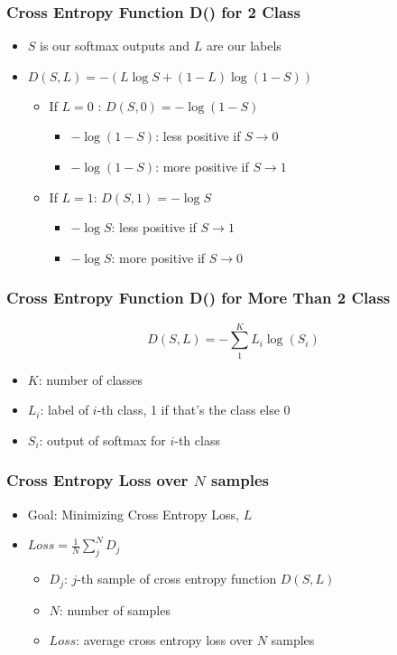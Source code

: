 \documentclass[14 pt]{beamer}
\let\olditem\item
\renewcommand{\item}{\olditem\vspace{4pt}}
\begin{document}
\begin{frame}
  \frametitle{Cross Entropy Function D() for 2 Class}
  \begin{itemize}
  \item $S$  is our softmax outputs and $L$ are our labels
  \item $D(S, L) = -(L\log S + (1 - L)\log (1 - S))$
    \begin{itemize}
    \item If $L = 0$ : $D(S, 0)  = -\log(1 - S)$
      \begin{itemize}
      \item $-\log (1 - S)$: less positive if $S \to 0$
      \item $-\log (1 - S)$: more positive if $S \to 1$
      \end{itemize}
    \item If $L = 1$: $D(S, 1) = -\log S$
      \begin{itemize}
      \item $-\log S$: less positive if $S\to 1$
      \item $-\log S$: more positive if $S\to 0$
      \end{itemize}
    \end{itemize}
  \end{itemize}
\end{frame}

\begin{frame}
  \frametitle{Cross Entropy Function D() for More Than 2 Class}
  \begin{displaymath}
    D(S, L) = -\sum_1^K L_i \log (S_i)
  \end{displaymath}
  \begin{itemize}
  \item $K$: number of classes
  \item $L_i$: label of $i$-th class, 1 if that's the class else 0
  \item $S_i$: output of softmax for $i$-th class
  \end{itemize}
\end{frame}

\begin{frame}
  \frametitle{Cross Entropy Loss over $N$ samples}
  \begin{itemize}
  \item Goal: Minimizing Cross Entropy Loss, $L$
  \item $Loss = \frac{1}{N}\sum_j^N D_j$
    \begin{itemize}
    \item $D_j$: $j$-th sample of cross entropy function $D(S, L)$
    \item $N$: number of samples
    \item $Loss$: average cross entropy loss over $N$ samples
    \end{itemize}
  \end{itemize}
\end{frame}
\end{document}
